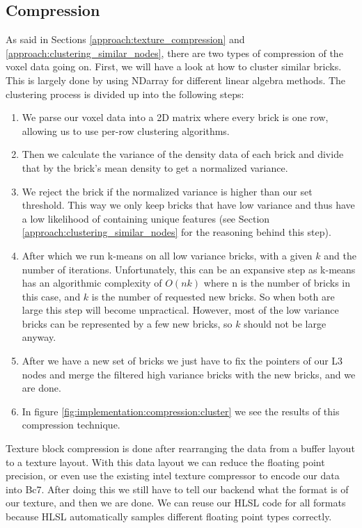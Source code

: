 \subsection{Compression} \label{implementation:compression}
As said in Sections \ref{approach:texture_compression} and \ref{approach:clustering_similar_nodes}, there are two types of compression of the voxel data going on. First, we will have a look at how to cluster similar bricks. This is largely done by using NDarray \cite{NDarray} for different linear algebra methods. The clustering process is divided up into the following steps:

\begin{enumerate}
    \itemsep0em
    \item We parse our voxel data into a 2D matrix where every brick is one row, allowing us to use per-row clustering algorithms.
    \item Then we calculate the variance of the density data of each brick and divide that by the brick's mean density to get a normalized variance.
    \item We reject the brick if the normalized variance is higher than our set threshold. This way we only keep bricks that have low variance and thus have a low likelihood of containing unique features (see Section \ref{approach:clustering_similar_nodes} for the reasoning behind this step).
    \item After which we run k-means on all low variance bricks, with a given $k$ and the number of iterations. Unfortunately, this can be an expansive step as k-means has an algorithmic complexity of $O(nk)$ where n is the number of bricks in this case, and $k$ is the number of requested new bricks. So when both are large this step will become unpractical. However, most of the low variance bricks can be represented by a few new bricks, so $k$ should not be large anyway.
    \item After we have a new set of bricks we just have to fix the pointers of our L3 nodes and merge the filtered high variance bricks with the new bricks, and we are done.
    \item In figure \ref{fig:implementation:compression:cluster} we see the results of this compression technique.
\end{enumerate}


\noindent Texture block compression is done after rearranging the data from a buffer layout to a texture layout. With this data layout we can reduce the floating point precision, or even use the existing intel texture compressor \cite{ISPCTextureCompressor} to encode our data into Bc7. After doing this we still have to tell our backend what the format is of our texture, and then we are done. We can reuse our HLSL code for all formats because HLSL automatically samples different floating point types correctly.




